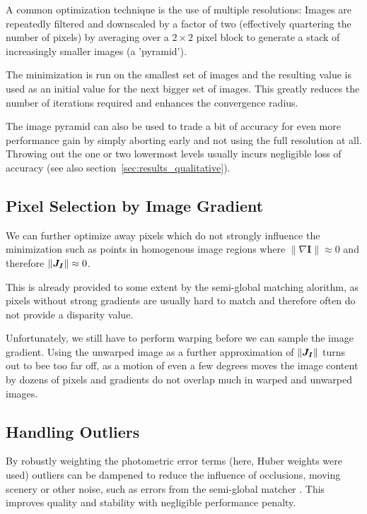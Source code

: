 A common optimization technique is the use of multiple resolutions: Images are
repeatedly filtered and downscaled by a factor of two (effectively quartering
the number of pixels) by averaging over a $2 \times 2$ pixel block to generate
a stack of increasingly smaller images (a 'pyramid').

The minimization is run on the smallest set of images and the resulting value
is used as an initial value for the next bigger set of images.
This greatly reduces the number of iterations required and enhances the
convergence radius.

The image pyramid can also be used to trade a bit of accuracy for even more
performance gain by simply aborting early and not using the full resolution at
all. Throwing out the one or two lowermost levels usually incurs negligible
loss of accuracy (see also section~\ref{sec:results_qualitative}).


\subsection{Pixel Selection by Image Gradient}
\label{sec:gradient_filtering}

We can further optimize away pixels which do not strongly influence the
minimization such as points in homogenous image regions where $\lVert \nabla
\mathbf{I} \rVert \approx 0$ and therefore $\lVert \mat{J_I} \rVert \approx 0$.

This is already provided to some extent by the semi-global matching alorithm,
as pixels without strong gradients are usually hard to match and therefore often
do not provide a disparity value.

Unfortunately, we still have to perform warping before we can sample the image
gradient. Using the unwarped image as a further approximation of $\lVert
\mat{J_I} \rVert$ turns out to bee too far off, as a motion of even a few
degrees moves the image content by dozens of pixels and gradients do not
overlap much in warped and unwarped images.

\subsection{Handling Outliers}

By robustly weighting the photometric error terms (here, Huber weights were
used) outliers can be dampened to reduce the influence of occlusions, moving
scenery or other noise, such as errors from the semi-global matcher
\cite{comport2007odometry}. This improves quality and stability with negligible
performance penalty.

